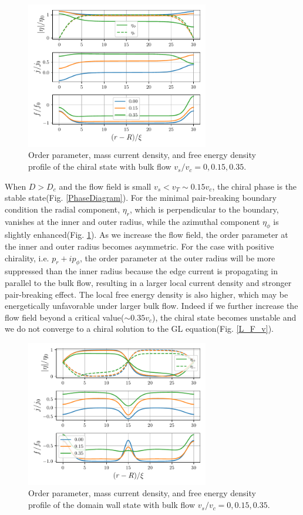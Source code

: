 \documentclass[aps,prb,reprint,groupedaddress]{revtex4-2}
\begin{document}
\begin{figure}
    \centering
    \includegraphics[width=8cm]{chiral.pdf}
    \caption{Order parameter, mass current density, and free energy density
        profile of the chiral state with bulk flow $v_s/v_c=0, 0.15, 0.35$.}
    \label{chiralOP}
\end{figure}

When $D>D_c$ and the flow field is small $v_s<v_T\sim 0.15v_c$, the
chiral phase is the stable state(Fig. \ref{PhaseDiagram}).
For the minimal pair-breaking boundary condition
the radial component, $\eta_r$, which is perpendicular to the boundary, vanishes at the inner
and outer radius, while the azimuthal component $\eta_\phi$ is slightly enhanced(Fig. \ref{chiralOP}).
As we increase the flow field, the order parameter at the inner and outer radius
becomes asymmetric. For the case with positive chirality, i.e. $p_r+ip_\phi$, the order
parameter at the outer radius will be more suppressed than the inner radius because
the edge current is propagating in parallel to the bulk flow,
resulting in a larger local current density and stronger pair-breaking effect.
The local free energy density is also higher, which may be energetically
unfavorable under larger bulk flow. Indeed if we further increase the flow field beyond
a critical value($\sim 0.35v_c$), the chiral state becomes unstable and
we do not converge to a chiral solution to the GL equation(Fig. \ref{L_F_v}).

\begin{figure}
    \centering
    \includegraphics[width=8cm]{mix.pdf}
    \caption{Order parameter, mass current density, and free energy density
        profile of the domain wall state with bulk flow $v_s/v_c=0, 0.15, 0.35$.}
    \label{DWOP}
\end{figure}
\end{document}
